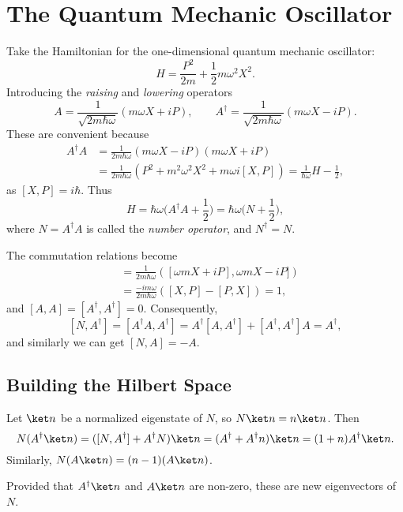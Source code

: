 \documentclass[12pt]{article}
\begin{document}
\newpage

\section{The Quantum Mechanic Oscillator}
\label{sec:qmo}

Take the Hamiltonian for the one-dimensional quantum mechanic oscillator:
\[
H = \frac{P^2}{2m} + \frac{1}{2} m\omega^2 X^2.
\]
Introducing the \emph{raising} and \emph{lowering} operators
\[
	A = \frac{1}{\sqrt{2 m \hbar \omega}}(m \omega X + iP), \qquad A^{\dagger} = \frac{1}{\sqrt{2m \hbar \omega}} (m\omega X - iP).
\]
These are convenient because
\begin{align*}
	A^{\dagger}A &= \frac{1}{2m\hbar \omega}(m\omega X - iP)(m\omega X + iP) \\
		     &= \frac{1}{2m\hbar \omega} (P^2 + m^2 \omega^2 X^2 + m \omega i [X,P]) = \frac{1}{\hbar \omega}H - \frac{1}{2},
\end{align*}
as $[X,P] = i \hbar$. Thus
\[
H = \hbar \omega \biggl(A^{\dagger}A + \frac{1}{2} \biggr) = \hbar \omega \biggl(N + \frac{1}{2} \biggr),
\]
where $N = A^{\dagger}A$ is called the \emph{number operator}, and $N^{\dagger} = N$.

The commutation relations become
\begin{align*}
	[A, A^{\dagger}] &= \frac{1}{2m\hbar \omega}([\omega m X + iP], \omega m X - iP]) \\
			 &= \frac{-i m \omega}{2 m \hbar \omega} ([X, P] - [P,X]) = 1,
\end{align*}
and $[A,A] = [A^{\dagger}, A^{\dagger}] = 0$. Consequently,
\[
	[N,A^{\dagger}] = [A^{\dagger}A,A^{\dagger}] = A^{\dagger}[A,A^{\dagger}] + [A^{\dagger},A^{\dagger}]A = A^{\dagger},
\]
and similarly we can get $[N,A] = -A$.

\subsection{Building the Hilbert Space}
\label{sub:build_H}

Let $\ket n$ be a normalized eigenstate of $N$, so $N \ket n = n \ket n$. Then
\[
	N(A^{\dagger}\ket n) = ([N,A^{\dagger}] + A^{\dagger}N)\ket n = (A^{\dagger} + A^{\dagger}n)\ket n = (1+n) A^{\dagger} \ket n.
\]
Similarly, $N(A \ket n) = (n-1) (A \ket n)$.

Provided that $A^{\dagger} \ket n$ and $A \ket n$ are non-zero, these are new eigenvectors of $N$.
\end{document}
